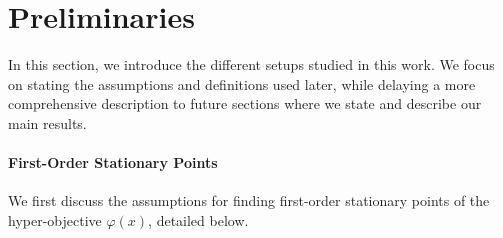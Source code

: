 \documentclass[twoside,11pt]{article}
\begin{document}

\section{Preliminaries}

In this section, we introduce the different setups studied in this work. We focus on stating the assumptions and definitions used later, while delaying a more comprehensive description to future sections where we state and describe our main results.

\paragraph{First-Order Stationary Points} 

We first discuss the assumptions for finding first-order stationary points of the hyper-objective $\varphi(x)$, detailed below.
\end{document}
